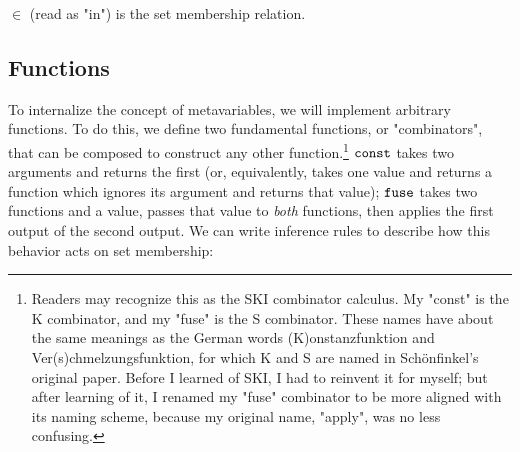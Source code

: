 \documentclass{article}
\begin{document}
  $\in$ (read as "in") is the set membership relation.
  
  \iffalse
  , the relation between things that we see fit to make indistinguishable. Informally, if $A \equals B$, then $A$ and $B$ are two different formulas that refer to the same mathematical object. Equal formulas can be substituted for each other at any position within a larger formula:
  \begin{align*}
    A \equals B &\vdash CA \equals CB\\
    A \equals B &\vdash AC \equals BC\\
    A \equals B, A &\vdash B\\
  \end{align*}
  
  We can also define the "subset" relation, as a simple notation:
  
  \begin{align*}
    (S \subseteq T) := (T \equals (T \union S))\\
  \end{align*}
  \fi
  
  \subsection{Functions}
  
  To internalize the concept of metavariables, we will implement arbitrary functions. To do this, we define two fundamental functions, or "combinators", that can be composed to construct any other function.\footnote{Readers may recognize this as the SKI combinator calculus. My "const" is the K combinator, and my "fuse" is the S combinator. These names have about the same meanings as the German words (K)onstanzfunktion and Ver(s)chmelzungsfunktion, for which K and S are named in Schönfinkel's original paper. Before I learned of SKI, I had to reinvent it for myself; but after learning of it, I renamed my "fuse" combinator to be more aligned with its naming scheme, because my original name, "apply", was no less confusing.} $\operatorname{\texttt{const}}$ takes two arguments and returns the first (or, equivalently, takes one value and returns a function which ignores its argument and returns that value); $\operatorname{\texttt{fuse}}$ takes two functions and a value, passes that value to \emph{both} functions, then applies the first output of the second output. We can write inference rules to describe how this behavior acts on set membership:
  
\end{document}
